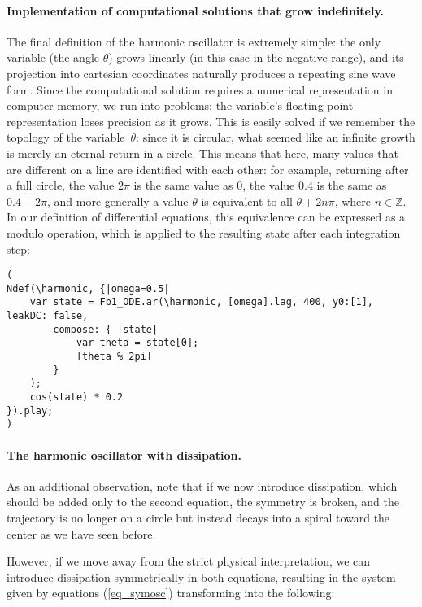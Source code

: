 \documentclass{article}
\begin{document}
\paragraph{Implementation of computational solutions that grow indefinitely.}
The final definition of the harmonic oscillator is extremely simple: the only variable (the angle $\theta$) grows linearly (in this case in the negative range), and its projection into cartesian coordinates naturally produces a repeating sine wave form. Since the computational solution requires a numerical representation in computer memory, we run into problems: the variable's floating point representation loses precision as it grows. This is easily solved if we remember the topology of the variable~$\theta$: since it is circular, what seemed like an infinite growth is merely an eternal return in a circle. This means that here, many values that are different on a line are identified with each other: for example, returning after a full circle, the value $2\pi$ is the same value as $0$, the value $0.4$ is the same as $0.4 + 2\pi$, and more generally a value $\theta$ is equivalent to all $\theta + 2n\pi$, where $n \in \mathbb{Z}$. In our definition of differential equations, this equivalence can be expressed as a modulo operation, which is applied to the resulting state after each integration step:

\begin{lstlisting}[caption=Projecting $\theta$ into a cyclic domain by a modulo operation.]
(
Ndef(\harmonic, {|omega=0.5|
	var state = Fb1_ODE.ar(\harmonic, [omega].lag, 400, y0:[1], leakDC: false,
		compose: { |state|
			var theta = state[0];
			[theta % 2pi]
		}
	);
	cos(state) * 0.2
}).play;
)
\end{lstlisting}


\paragraph{The harmonic oscillator with dissipation.}
As an additional observation, note that if we now introduce dissipation, which should be added only to the second equation, the symmetry is broken, and the trajectory is no longer on a circle but instead decays into a spiral toward the center as we have seen before.

However, if we move away from the strict physical interpretation, we can introduce dissipation symmetrically in both equations, resulting in the system given by equations (\ref{eq_symosc}) transforming into the following:
\end{document}
